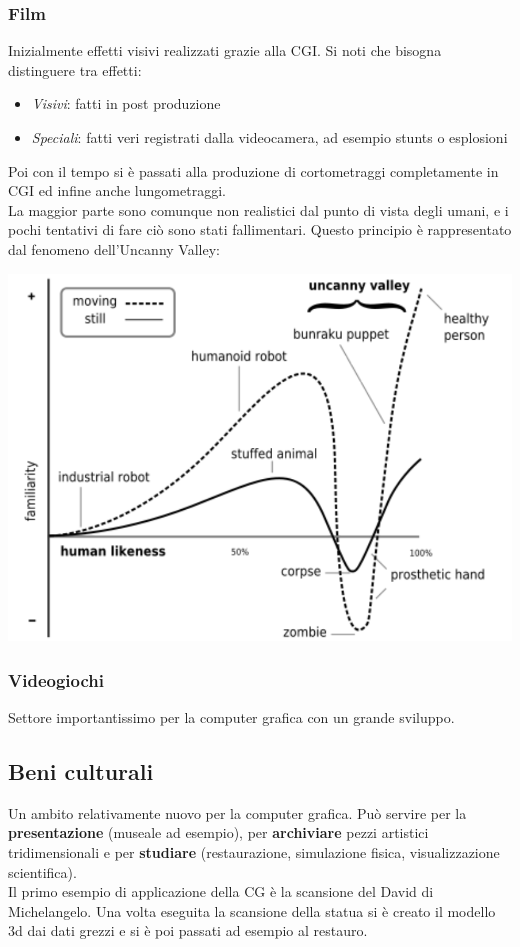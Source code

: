 \subsubsection{Film}
Inizialmente effetti visivi realizzati grazie alla CGI. Si noti che bisogna distinguere tra effetti:
\begin{itemize}
	\item \emph{Visivi}: fatti in post produzione 
	\item \emph{Speciali}: fatti veri registrati dalla videocamera, ad esempio stunts o esplosioni
\end{itemize}
Poi con il tempo si è passati alla produzione di cortometraggi completamente in CGI ed infine anche lungometraggi.\\
La maggior parte sono comunque non realistici dal punto di vista degli umani, e i pochi tentativi di fare ciò sono stati fallimentari. Questo principio è rappresentato dal fenomeno dell'Uncanny Valley:
\begin{center}
	\includegraphics[scale=0.3]{uncanney_valley.png}
\end{center}
\subsubsection{Videogiochi}
Settore importantissimo per la computer grafica con un grande sviluppo.

\subsection{Beni culturali}
Un ambito relativamente nuovo per la computer grafica. Può servire per la \textbf{presentazione} (museale ad esempio), per \textbf{archiviare} pezzi artistici tridimensionali e per \textbf{studiare} (restaurazione, simulazione fisica, visualizzazione scientifica). \\
Il primo esempio di applicazione della CG è la scansione del David di Michelangelo. Una volta eseguita la scansione della statua si è creato il modello 3d dai dati grezzi e si è poi passati ad esempio al restauro.

